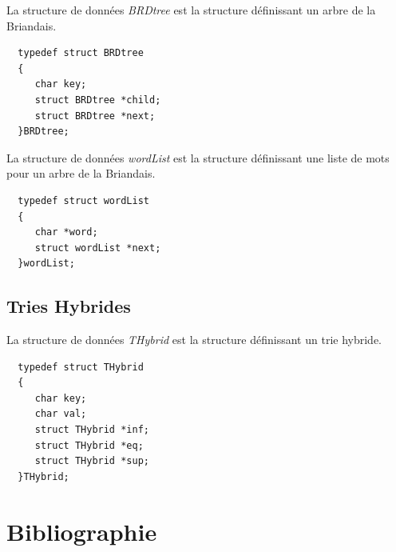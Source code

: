 \documentclass[a4paper,8pt]{report}
\begin{document}
La structure de donn\'ees \textit{BRDtree} est la structure d\'efinissant un arbre de la Briandais.
\begin{verbatim}
  typedef struct BRDtree
  {
     char key; 
     struct BRDtree *child; 
     struct BRDtree *next; 
  }BRDtree;
\end{verbatim}

La structure de donn\'ees \textit{wordList} est la structure d\'efinissant une liste de mots pour un arbre de la Briandais.
\begin{verbatim}
  typedef struct wordList
  {
     char *word;
     struct wordList *next;
  }wordList;
\end{verbatim}

\subsection*{Tries Hybrides}\label{sec:name}

La structure de donn\'ees \textit{THybrid} est la structure d\'efinissant un trie hybride.
\begin{verbatim}
  typedef struct THybrid
  {
     char key;
     char val;
     struct THybrid *inf;
     struct THybrid *eq;
     struct THybrid *sup;
  }THybrid;
\end{verbatim}

\listoffigures
\newpage
\section*{Bibliographie}\label{sec:name}
\end{document}
